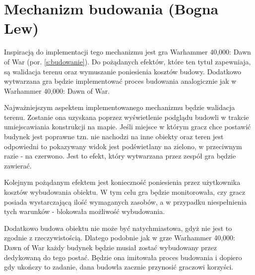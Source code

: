 \section{Mechanizm budowania (Bogna Lew)}\label{chap:build}
Inspiracją do implementacji tego mechanizmu jest gra Warhammer 40,000: Dawn of War (por. \ref{s:budowanie}). Do pożądanych
efektów, które ten tytuł zapewniaja, są walidacja terenu oraz wymuszanie poniesienia kosztów budowy. Dodatkowo
wytwarzana gra będzie implementować proces budowania analogicznie jak w Warhammer 40,000: Dawn of War.

Najważniejszym aspektem implementowanego mechanizmu będzie walidacja terenu. Zostanie ona uzyskana poprzez wyświetlenie
podglądu budowli w trakcie umiejscawiania konstrukcji na mapie. Jeśli miejsce w którym gracz chce postawić budynek jest
poprawne tzn. nie nachodzi na inne obiekty oraz teren jest odpowiedni to pokazywany widok jest podświetlany na zielono,
w przeciwnym razie - na czerwono. Jest to efekt, który wytwarzana przez zespół gra będzie zawierać.

Kolejnym pożądanym efektem jest konieczność poniesienia przez użytkownika kosztów
wybudowania obiektu. W tym celu gra będzie monitorowała, czy gracz posiada wystarczającą ilość wymaganych zasobów, a w
przypadku niespełnienia tych warunków - blokowała możliwość wybudowania.

Dodatkowo budowa obiektu nie może być natychmiastowa, gdyż nie jest to zgodnie z rzeczywistością. Dlatego podobnie jak w
grze Warhammer 40,000: Dawn of War każdy budynek będzie musiał zostać wybudowany przez dedykowaną do tego postać. Będzie
ona imitowała proces budowania i dopiero gdy ukończy to zadanie, dana budowla zacznie przynosić graczowi korzyści.
